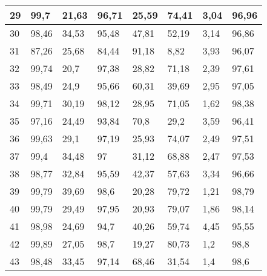 \begin{longtable}[c]{|l|l|l|l|l|l|l|l|}
29              & 99,7         & 21,63        & 96,71       & 25,59         & 74,41         & 3,04          & 96,96         \\ \hline
30              & 98,46        & 34,53        & 95,48       & 47,81         & 52,19         & 3,14          & 96,86         \\ \hline
31              & 87,26        & 25,68        & 84,44       & 91,18         & 8,82          & 3,93          & 96,07         \\ \hline
32              & 99,74        & 20,7         & 97,38       & 28,82         & 71,18         & 2,39          & 97,61         \\ \hline
33              & 98,49        & 24,9         & 95,66       & 60,31         & 39,69         & 2,95          & 97,05         \\ \hline
34              & 99,71        & 30,19        & 98,12       & 28,95         & 71,05         & 1,62          & 98,38         \\ \hline
35              & 97,16        & 24,49        & 93,84       & 70,8          & 29,2          & 3,59          & 96,41         \\ \hline
36              & 99,63        & 29,1         & 97,19       & 25,93         & 74,07         & 2,49          & 97,51         \\ \hline
37              & 99,4         & 34,48        & 97          & 31,12         & 68,88         & 2,47          & 97,53         \\ \hline
38              & 98,77        & 32,84        & 95,59       & 42,37         & 57,63         & 3,34          & 96,66         \\ \hline
39              & 99,79        & 39,69        & 98,6        & 20,28         & 79,72         & 1,21          & 98,79         \\ \hline
40              & 99,79        & 29,49        & 97,95       & 20,93         & 79,07         & 1,86          & 98,14         \\ \hline
41              & 98,98        & 24,69        & 94,7        & 40,26         & 59,74         & 4,45          & 95,55         \\ \hline
42              & 99,89        & 27,05        & 98,7        & 19,27         & 80,73         & 1,2           & 98,8          \\ \hline
43              & 98,48        & 33,45        & 97,14       & 68,46         & 31,54         & 1,4           & 98,6          \\ \hline

\end{longtable}
